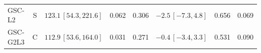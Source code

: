 \begin{longtable}{lcp{37mm}rrp{37mm}rr}
GSC-L2 & S & \(123.1\,[54.3,221.6]\) & 0.062 & 0.306 & \(-2.5\,[-7.3,4.8]\) & 0.656 & 0.069\\
GSC-G2L3 & C & \(112.9\,[53.6,164.0]\) & 0.031 & 0.271 & \(-0.4\,[-3.4,3.3]\) & 0.531 & 0.090\\

\end{longtable}
